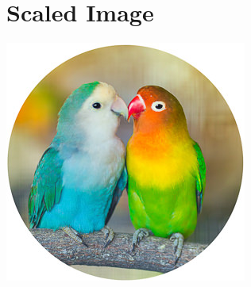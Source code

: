 \documentclass{article}
\begin{document}
    \section{Scaled Image}
    \includegraphics[scale=0.5]{parrot.jpeg}
\end{document}
